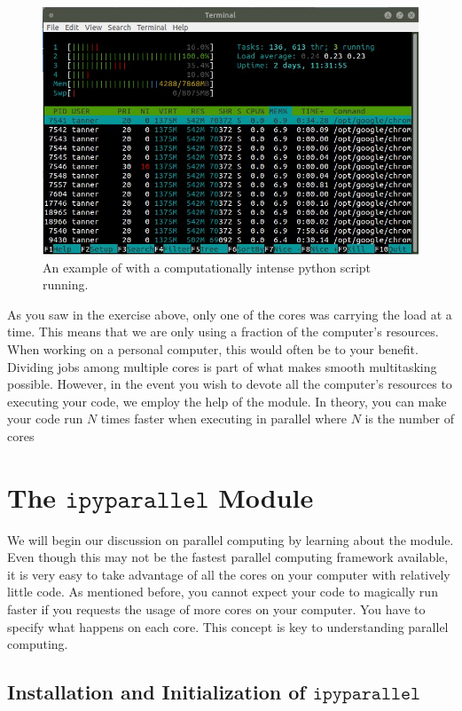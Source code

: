 \begin{figure}
    \includegraphics[width=\textwidth]{active.jpg}
\caption{An example of  with a computationally intense python script running.}
\label{fig:htop}
\end{figure}

As you saw in the exercise above, only one of the cores was carrying the load at a time. This means that we are only using a fraction of the computer's resources. When working on a personal computer, this would often be to your benefit. Dividing jobs among multiple cores is part of what makes smooth multitasking possible. However, in the event you wish to devote all the computer's resources to executing your code, we employ the help of the  module. In theory, you can make your code run $N$ times faster when executing in parallel where $N$ is the number of cores

\section*{The $\texttt{ipyparallel}$ Module}
We will begin our discussion on parallel computing by learning about the  module. Even though this may not be the fastest parallel computing framework available, it is very easy to take advantage of all the cores on your computer with relatively little code. As mentioned before, you cannot expect your code to magically run faster if you requests the usage of more cores on your computer. You have to specify what happens on each core. This concept is key to understanding parallel computing.

\subsection*{Installation and Initialization of $\texttt{ipyparallel}$}

